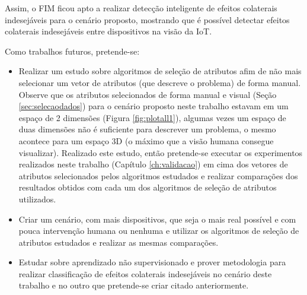 Assim, o FIM ficou apto a realizar detecção inteligente de efeitos colaterais indesejáveis para o cenário proposto, mostrando que é possível detectar efeitos colaterais indesejáveis entre dispositivos na visão da IoT.

Como trabalhos futuros, pretende-se:
\begin{itemize}
\item Realizar um estudo sobre algoritmos de seleção de atributos afim de não mais selecionar um vetor de atributos (que descreve o problema) de forma manual. Observe que os atributos selecionados de forma manual e visual (Seção \ref{sec:selecaodados}) para o cenário proposto neste trabalho estavam em um espaço de 2 dimensões (Figura \ref{fig:plotall1}), algumas vezes um espaço de duas dimensões não é suficiente para descrever um problema, o mesmo acontece para um espaço 3D (o máximo que a visão humana consegue visualizar). Realizado este estudo, então pretende-se executar os experimentos realizados neste trabalho (Capítulo \ref{ch:validacao}) em cima dos vetores de atributos selecionados pelos algoritmos estudados e realizar comparações dos resultados obtidos com cada um dos algoritmos de seleção de atributos utilizados.
\item Criar um cenário, com mais dispositivos, que seja o mais real possível e com pouca intervenção humana ou nenhuma e utilizar os algoritmos de seleção de atributos estudados e realizar as mesmas comparações.
\item Estudar sobre aprendizado não supervisionado e prover metodologia para realizar classificação de efeitos colaterais indesejáveis no cenário deste trabalho e no outro que pretende-se criar citado anteriormente.
\end{itemize}
